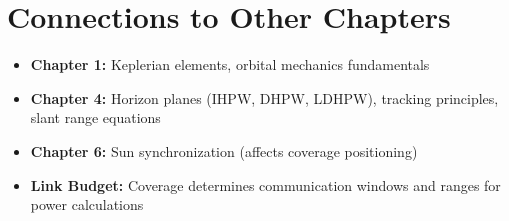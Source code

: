 \documentclass[11pt,letterpaper]{article}
\begin{document}
\section{Connections to Other Chapters}

\begin{itemize}
    \item \textbf{Chapter 1:} Keplerian elements, orbital mechanics fundamentals
    \item \textbf{Chapter 4:} Horizon planes (IHPW, DHPW, LDHPW), tracking principles, slant range equations
    \item \textbf{Chapter 6:} Sun synchronization (affects coverage positioning)
    \item \textbf{Link Budget:} Coverage determines communication windows and ranges for power calculations
\end{itemize}
\end{document}
